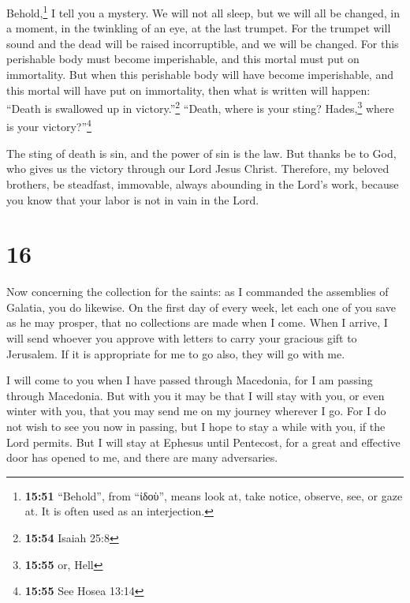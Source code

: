  Behold,\footnote{\textbf{15:51} ``Behold'', from
  ``ἰδοὺ'', means look at, take notice, observe, see, or gaze at. It is
  often used as an interjection.} I tell you a mystery. We will not all
sleep, but we will all be changed,  in a moment, in the
twinkling of an eye, at the last trumpet. For the trumpet will sound and
the dead will be raised incorruptible, and we will be changed.
 For this perishable body must become imperishable, and
this mortal must put on immortality.  But when this
perishable body will have become imperishable, and this mortal will have
put on immortality, then what is written will happen: ``Death is
swallowed up in victory.''\footnote{\textbf{15:54} Isaiah 25:8}
 ``Death, where is your sting? Hades,\footnote{\textbf{15:55}
  or, Hell} where is your victory?''\footnote{\textbf{15:55} See Hosea
  13:14}

 The sting of death is sin, and the power of sin is the
law.  But thanks be to God, who gives us the victory
through our Lord Jesus Christ.  Therefore, my beloved
brothers, be steadfast, immovable, always abounding in the Lord's work,
because you know that your labor is not in vain in the Lord.

\hypertarget{section-15}{%
\section{16}\label{section-15}}

 Now concerning the collection for the saints: as I
commanded the assemblies of Galatia, you do likewise.  On
the first day of every week, let each one of you save as he may prosper,
that no collections are made when I come.  When I arrive,
I will send whoever you approve with letters to carry your gracious gift
to Jerusalem.  If it is appropriate for me to go also,
they will go with me.

 I will come to you when I have passed through Macedonia,
for I am passing through Macedonia.  But with you it may
be that I will stay with you, or even winter with you, that you may send
me on my journey wherever I go.  For I do not wish to see
you now in passing, but I hope to stay a while with you, if the Lord
permits.  But I will stay at Ephesus until Pentecost,
 for a great and effective door has opened to me, and
there are many adversaries.


